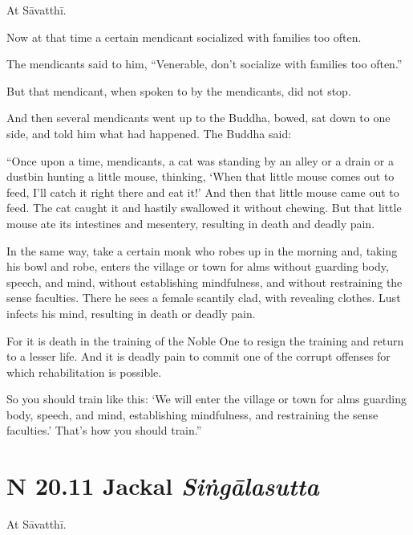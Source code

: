 \documentclass[12pt,openany]{book}%
\newcommand*{\suttatitleacronym}[1]{\smaller[2]{#1}\vspace*{.3em}}
\newcommand*{\suttatitletranslation}[1]{\linebreak{#1}}
\newcommand*{\suttatitleroot}[1]{\linebreak\smaller[2]\itshape{#1}}
\newcommand*{\tocacronym}[1]{\hspace*{-3.3em}{#1}\quad}
\newcommand*{\toctranslation}[1]{#1}
\newcommand*{\tocroot}[1]{(\textit{#1})}
\begin{document}
At \textsanskrit{Sāvatthī}. 

Now at that time a certain mendicant socialized with families too often. 

The mendicants said to him, “Venerable, don’t socialize with families too often.” 

But that mendicant, when spoken to by the mendicants, did not stop. 

And then several mendicants went up to the Buddha, bowed, sat down to one side, and told him what had happened. The Buddha said: 

“Once upon a time, mendicants, a cat was standing by an alley or a drain or a dustbin hunting a little mouse, thinking, ‘When that little mouse comes out to feed, I’ll catch it right there and eat it!’ And then that little mouse came out to feed. The cat caught it and hastily swallowed it without chewing. But that little mouse ate its intestines and mesentery, resulting in death and deadly pain. 

In the same way, take a certain monk who robes up in the morning and, taking his bowl and robe, enters the village or town for alms without guarding body, speech, and mind, without establishing mindfulness, and without restraining the sense faculties. There he sees a female scantily clad, with revealing clothes. Lust infects his mind, resulting in death or deadly pain. 

For it is death in the training of the Noble One to resign the training and return to a lesser life. And it is deadly pain to commit one of the corrupt offenses for which rehabilitation is possible. 

So you should train like this: ‘We will enter the village or town for alms guarding body, speech, and mind, establishing mindfulness, and restraining the sense faculties.’ That’s how you should train.” 

%
\section*{{\suttatitleacronym SN 20.11}{\suttatitletranslation A Jackal }{\suttatitleroot Siṅgālasutta}}
\addcontentsline{toc}{section}{\tocacronym{SN 20.11} \toctranslation{A Jackal } \tocroot{Siṅgālasutta}}

At \textsanskrit{Sāvatthī}. 
\end{document}
